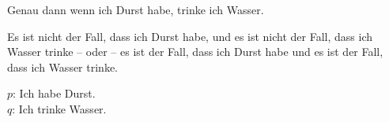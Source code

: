 \begin{frame}

\begin{exe}
 Genau dann wenn ich Durst habe, trinke ich Wasser.

 Es ist nicht der Fall, dass ich Durst habe, und es ist nicht der Fall, dass ich Wasser trinke -- oder -- es ist der Fall, dass ich Durst habe und es ist der Fall, dass ich Wasser trinke.
\end{exe}


{\small $p$: Ich habe Durst.\\
$q$: Ich trinke Wasser.}

\pause 

\begin{minipage}{0.35\textwidth}
	\centering

\end{minipage}
\pause
\begin{minipage}{0.55\textwidth}
	\centering

\end{minipage}

\end{frame}


